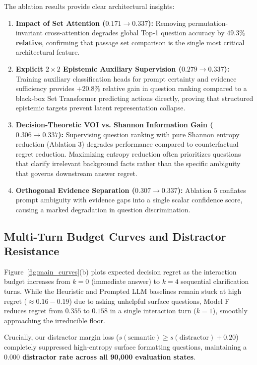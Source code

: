 The ablation results provide clear architectural insights:
\begin{enumerate}
    \item \textbf{Impact of Set Attention ($0.171 \to 0.337$):} Removing permutation-invariant cross-attention degrades global Top-1 question accuracy by \textbf{$49.3\%$ relative}, confirming that passage set comparison is the single most critical architectural feature.
    \item \textbf{Explicit $2 \times 2$ Epistemic Auxiliary Supervision ($0.279 \to 0.337$):} Training auxiliary classification heads for prompt certainty and evidence sufficiency provides $+20.8\%$ relative gain in question ranking compared to a black-box Set Transformer predicting actions directly, proving that structured epistemic targets prevent latent representation collapse.
    \item \textbf{Decision-Theoretic VOI vs. Shannon Information Gain ($0.306 \to 0.337$):} Supervising question ranking with pure Shannon entropy reduction (Ablation 3) degrades performance compared to counterfactual regret reduction. Maximizing entropy reduction often prioritizes questions that clarify irrelevant background facts rather than the specific ambiguity that governs downstream answer regret.
    \item \textbf{Orthogonal Evidence Separation ($0.307 \to 0.337$):} Ablation 5 conflates prompt ambiguity with evidence gaps into a single scalar confidence score, causing a marked degradation in question discrimination.
\end{enumerate}

\subsection{Multi-Turn Budget Curves and Distractor Resistance}
Figure~\ref{fig:main_curves}(b) plots expected decision regret as the interaction budget increases from $k=0$ (immediate answer) to $k=4$ sequential clarification turns. While the Heuristic and Prompted LLM baselines remain stuck at high regret ($\approx 0.16 - 0.19$) due to asking unhelpful surface questions, Model F reduces regret from $0.355$ to $0.158$ in a single interaction turn ($k=1$), smoothly approaching the irreducible floor.

Crucially, our distractor margin loss ($s(\text{semantic}) \ge s(\text{distractor}) + 0.20$) completely suppressed high-entropy surface formatting questions, maintaining a \textbf{$0.000$ distractor rate across all 90,000 evaluation states}.

